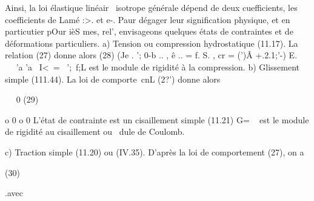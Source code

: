 Ainsi, la loi élastique linéair~ isotrope générale dépend de deux cuefficients, les coefficients de Lamé :>. et e-. Paur dégager leur signifi­cation physique, et en particutier pOur ièS mes, rel', envisageons quelques états de contraintes et de déformations particuliers. 
a) Tension ou compression hydrostatique (11.17). La relation (27) donne alors 
(28) (Je . '; 0-b .. , ê .. = f. S. , cr = (')Â +.2.1;'-) E. 
~~ 
~~
'a 'a 
~I<\ = ~';\+~f;L est le module de rigidité à la compression. 
b) Glissement simple (111.44). La loi de comporte~cnL (2?') donne alors 

~~ 0 
(29) 

o 0 
o 0 
L'état de contrainte est un cisaillement simple (11.21) 
G= ~ est le module de rigidité au cisaillement ou ~dule de Coulomb. 

c) Traction simple (11.20) ou (IV.35). D'après la loi de comportement (27), 
on a 

(30) 



.avec 


